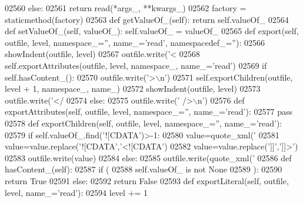 \begin{DoxyCode}
{{{{{{{{{{{{{{{{{{{{{{{{{{{{{{{{{{{{{{{{{{{{{{{{{{{{{{{{{{{{{{{{{{{{{{{{{{{{{{{{{{{{{{{{{{{{{{{{{{{{{{{{{{{{{{{{{{{{{{{{{{{{{{{{{{{{{{{{{{{{{{{{{{{{{{{{{{{{{{{{{{{{{{{{{{{{{{{{{{{{02560         \textcolor{keywordflow}{else}:
02561             \textcolor{keywordflow}{return} read(*args\_, **kwargs\_)
02562     factory = staticmethod(factory)
02563     \textcolor{keyword}{def }getValueOf_(self): \textcolor{keywordflow}{return} self.valueOf\_
02564     \textcolor{keyword}{def }setValueOf_(self, valueOf\_): self.valueOf\_ = valueOf\_
02565     \textcolor{keyword}{def }export(self, outfile, level, namespace\_='', name\_='read', namespacedef\_=''):
02566         showIndent(outfile, level)
02567         outfile.write(\textcolor{stringliteral}{'<%
02568         self.exportAttributes(outfile, level, namespace\_, name\_=\textcolor{stringliteral}{'read'})
02569         \textcolor{keywordflow}{if} self.hasContent_():
02570             outfile.write(\textcolor{stringliteral}{'>\(\backslash\)n'})
02571             self.exportChildren(outfile, level + 1, namespace\_, name\_)
02572             showIndent(outfile, level)
02573             outfile.write(\textcolor{stringliteral}{'</%
02574         \textcolor{keywordflow}{else}:
02575             outfile.write(\textcolor{stringliteral}{' />\(\backslash\)n'})
02576     \textcolor{keyword}{def }exportAttributes(self, outfile, level, namespace\_='', name\_='read'):
02577         \textcolor{keywordflow}{pass}
02578     \textcolor{keyword}{def }exportChildren(self, outfile, level, namespace\_='', name\_='read'):
02579         \textcolor{keywordflow}{if} self.valueOf\_.find(\textcolor{stringliteral}{'![CDATA'})>-1:
02580             value=quote_xml(\textcolor{stringliteral}{'%
02581             value=value.replace(\textcolor{stringliteral}{'![CDATA'},\textcolor{stringliteral}{'<![CDATA'})
02582             value=value.replace(\textcolor{stringliteral}{']]'},\textcolor{stringliteral}{']]>'})
02583             outfile.write(value)
02584         \textcolor{keywordflow}{else}:
02585             outfile.write(quote_xml(\textcolor{stringliteral}{'%
02586     \textcolor{keyword}{def }hasContent_(self):
02587         \textcolor{keywordflow}{if} (
02588             self.valueOf_ \textcolor{keywordflow}{is} \textcolor{keywordflow}{not} \textcolor{keywordtype}{None}
02589             ):
02590             \textcolor{keywordflow}{return} \textcolor{keyword}{True}
02591         \textcolor{keywordflow}{else}:
02592             \textcolor{keywordflow}{return} \textcolor{keyword}{False}
02593     \textcolor{keyword}{def }exportLiteral(self, outfile, level, name\_='read'):
02594         level += 1
}}}}}}}}}}}}}}}}}}}}}}}}}}}}}}}}}}}}}}}}}}}}}}}}}}}}}}}}}}}}}}}}}}}}}}}}}}}}}}}}}}}}}}}}}}}}}}}}}}}}}}}}}}}}}}}}}}}}}}}}}}}}}}}}}}}}}}}}}}}}}}}}}}}}}}}}}}}}}}}}}}}}}}}}}}}}}}}}}}}}}}}}
\end{DoxyCode}
